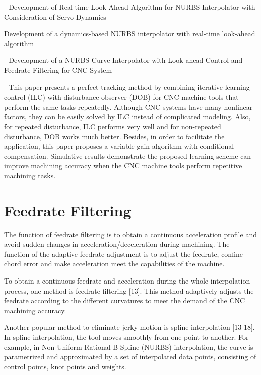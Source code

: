 \begin{tcolorbox}
	
\cite{Lin_2007-02} - Development of Real-time Look-Ahead Algorithm for NURBS Interpolator with Consideration of Servo Dynamics	

\cite{Lin_2007-01}	Development of a dynamics-based NURBS interpolator with real-time look-ahead algorithm

\cite{Zhang_2009} - Development of a NURBS Curve Interpolator with Look-ahead Control and Feedrate Filtering for CNC System
	
\cite{Tingting_2016} - This paper presents a perfect tracking method by combining iterative learning control (ILC) with disturbance observer (DOB) for CNC machine tools that perform the same tasks repeatedly. Although CNC systems have many nonlinear factors, they can be easily solved by ILC instead of complicated modeling. Also, for repeated disturbance, ILC performs very well and for non-repeated disturbance, DOB works much better. Besides, in order to facilitate the application, this paper proposes a variable gain algorithm with conditional compensation. Simulative results demonstrate the proposed learning scheme can improve machining accuracy when the CNC machine tools perform repetitive machining tasks.
\end{tcolorbox}

\section{Feedrate Filtering}

The function of feedrate filtering is to obtain a continuous acceleration profile and avoid sudden changes in acceleration/deceleration during machining. The function of the adaptive feedrate adjustment is to adjust the feedrate, confine chord error and make acceleration meet the capabilities of the machine.
\vspace*{1\baselineskip}

To obtain a continuous feedrate and acceleration during the whole interpolation process, one method is feedrate filtering [13]. This method adaptively adjusts the feedrate according to the different curvatures to meet the demand of the CNC machining accuracy. 
\vspace*{1\baselineskip}

Another popular method to eliminate jerky motion is spline interpolation [13-18]. In spline interpolation, the tool moves smoothly from one point to another. For example, in Non-Uniform Rational B-Spline (NURBS) interpolation, the curve is parametrized and approximated by a set of interpolated data points, consisting of control points, knot points and weights. 
\vspace*{1\baselineskip}

